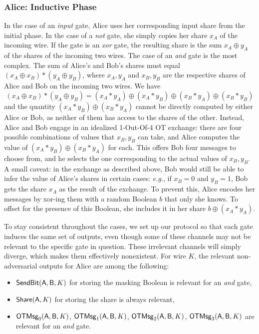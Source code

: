\subsubsection{Alice: Inductive Phase}
In the case of an \emph{input} gate, Alice uses her corresponding input share from the initial phase. In the case of a \emph{not} gate, she simply copies her share $x_A$ of the incoming wire. If the gate is an \emph{xor} gate, the resulting share is the sum $x_A \oplus y_A$ of the shares of the incoming two wires. The case of an \emph{and} gate is the most complex. The sum of Alice's and Bob's shares must equal $(x_A \oplus x_B) * (y_A \oplus y_B)$, where $x_A,y_A$ and $x_B,y_B$ are the respective shares of Alice and Bob on the incoming two wires. We have
\[(x_A \oplus x_B) * (y_A \oplus y_B) = (x_A * y_A) \oplus (x_A * y_B) \oplus (x_B * y_A) \oplus (x_B * y_B)\]
and the quantity $(x_A * y_B) \oplus (x_B * y_A)$ cannot be directly computed by either Alice or Bob, as neither of them has access to the shares of the other. Instead, Alice and Bob engage in an idealized 1-Out-Of-4 OT exchange: there are four possible combinations of values that $x_B,y_B$ can take, and Alice computes the value of $(x_A * y_B) \oplus (x_B * y_A)$ for each. This offers Bob four messages to choose from, and he selects the one corresponding to the actual values of $x_B,y_B$. A small caveat: in the exchange as described above, Bob would still be able to infer the value of Alice's shares in certain cases: \emph{e.g.}, if $x_B = 0$ and $y_B = 1$, Bob gets the share $x_A$ as the result of the exchange. To prevent this, Alice encodes her messages by xor-ing them with a random Boolean $b$ that only she knows. To offset for the presence of this Boolean, she includes it in her share $b \oplus (x_A * y_A)$.\medskip

To stay consistent throughout the cases, we set up our protocol so that each gate induces the same set of outputs, even though some of these channels may not be relevant to the specific gate in question. These irrelevant channels will simply diverge, which makes them effectively nonexistent. For wire $K$, the relevant non-adversarial outputs for Alice are among the following:
\begin{itemize}
\item $\mathsf{SendBit}(\mathsf{A},\mathsf{B},K)$ for storing the masking Boolean is relevant for an \emph{and} gate,
\item $\mathsf{Share}(\mathsf{A},K)$ for storing the share is always relevant,
\item $\mathsf{OTMsg}_0(\mathsf{A},\mathsf{B},K)$, $\mathsf{OTMsg}_1(\mathsf{A},\mathsf{B},K)$, $\mathsf{OTMsg}_2(\mathsf{A},\mathsf{B},K)$, $\mathsf{OTMsg}_3(\mathsf{A},\mathsf{B},K)$ are relevant for an \emph{and} gate.
\end{itemize}


